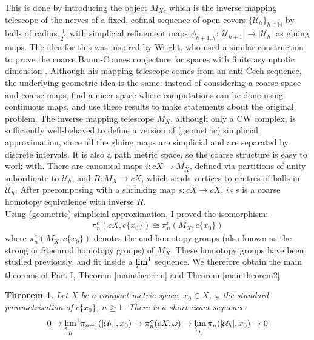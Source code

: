 \documentclass[a4paper,11pt]{article}
\theoremstyle{definition}
\theoremstyle{plain}
\newtheorem*{theorem*}{Theorem}
\theoremstyle{remark}
\begin{document}
This is done by introducing the object $M_{X}$, which is the inverse mapping telescope of the nerves of a fixed, cofinal sequence of open covers $\{\mathcal{U}_{h}\}_{h\in \mathbb{N}}$ by balls of radius $\frac{1}{2^h}$ with simplicial refinement maps $\phi_{h+1,h}: |\mathcal{U}_{h+1}|\rightarrow |\mathcal{U}_{h}|$ as gluing maps. The idea for this was inspired by Wright, who used a similar construction to prove the coarse Baum-Connes conjecture for spaces with finite asymptotic dimension \cite{wright2005coarse}. Although his mapping telescope comes from an anti-\v{C}ech sequence, the underlying geometric idea is the same: instead of considering a coarse space and coarse maps, find a nicer space where computations can be done using continuous maps, and use these results to make statements about the original problem. The inverse mapping telescope $M_{X}$, although only a CW complex, is sufficiently well-behaved to define a version of (geometric) simplicial approximation, since all the gluing maps are simplicial and are separated by discrete intervals. It is also a path metric space, so the coarse structure is easy to work with. There are canonical maps $i: cX\rightarrow M_{X}$, defined via partitions of unity subordinate to $\mathcal{U}_{h}$, and $R: M_{X}\rightarrow cX$, which sends vertices to centres of balls in $\mathcal{U}_{h}$. After precomposing with a shrinking map $s: cX\rightarrow cX$, $i\circ s$ is a coarse homotopy equivalence with inverse $R$. \\

Using (geometric) simplicial approximation, I proved the isomorphism:
\begin{align*}
\pi_{n}^{c}(cX,c\{x_0\}) \cong \pi_{n}^{e}(M_{X},c\{x_0\})
\end{align*}
where $\pi_{n}^{e}(M_{X},c\{x_0\})$ denotes the end homotopy groups (also known as the strong or Steenrod homotopy groups) of $M_{X}$. These homotopy groups have been studied previously, and fit inside a $\varprojlim^1$ sequence. We therefore obtain the main theorems of Part I, Theorem \ref{maintheorem} and Theorem \ref{maintheorem2}: 

\begin{theorem*} Let $X$ be a compact metric space, $x_0\in X$, $\omega$ the standard parametrisation of $c\{x_0\}$, $n\geq 1$. There is a short exact sequence:
\begin{align*}
0\rightarrow {\varprojlim_h}^1  \pi_{n+1}(|\mathcal{U}_{h}|,x_0) \rightarrow  \pi_{n}^c(cX,\omega) \rightarrow   \varprojlim_{h} \pi_n (|\mathcal{U}_{h}|,x_0)  \rightarrow 0
\end{align*}
\end{theorem*}
\end{document}
